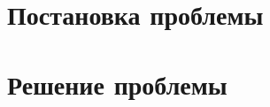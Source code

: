 \documentclass[a4paper, 14pt]{extreport}
\begin{document}


\chapter{Постановка проблемы}




\chapter{Решение проблемы}



\printbibliography
\end{document}
